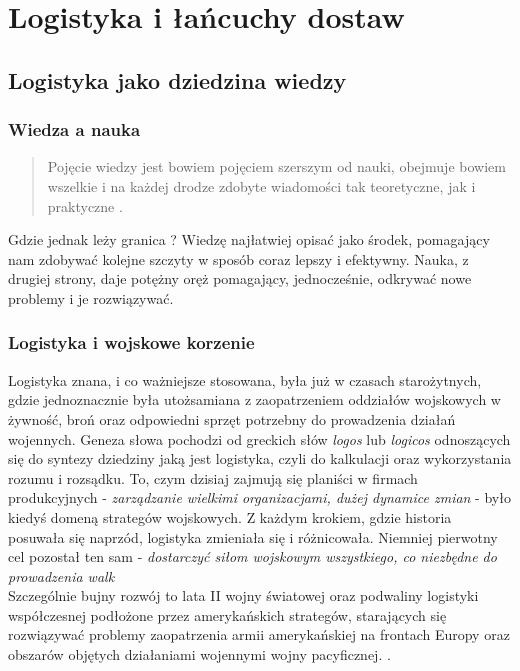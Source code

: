\chapter{Logistyka i łańcuchy dostaw}
\label{c2:c2}

\section{Logistyka jako dziedzina wiedzy}
	\subsection{Wiedza a nauka}	
		\begin{quote}
			Pojęcie wiedzy jest bowiem pojęciem szerszym od nauki,
			obejmuje bowiem wszelkie i na każdej drodze zdobyte wiadomości
			tak teoretyczne, jak i praktyczne \cite{organizacja_badan_ocen_prac_naukowych}.
		\end{quote}
		
		Gdzie jednak leży granica ? Wiedzę najłatwiej opisać jako środek, pomagający 
		nam zdobywać kolejne szczyty w sposób coraz lepszy i efektywny. Nauka, z drugiej strony,
		daje potężny oręż pomagający, jednocześnie, odkrywać nowe problemy i je rozwiązywać.
		
	\subsection{Logistyka i wojskowe korzenie}
		Logistyka znana, i co ważniejsze stosowana, była już w czasach starożytnych, gdzie jednoznacznie
		była utożsamiana z zaopatrzeniem oddziałów wojskowych w żywność, broń oraz odpowiedni
		sprzęt potrzebny do prowadzenia działań wojennych. Geneza słowa pochodzi od greckich
		słów \emph{logos} lub \emph{logicos} odnoszących się do syntezy dziedziny jaką jest logistyka,
		czyli do kalkulacji oraz wykorzystania rozumu i rozsądku. To, czym dzisiaj zajmują się planiści w 
		firmach produkcyjnych - \emph{zarządzanie wielkimi organizacjami, dużej dynamice zmian} - było kiedyś 
		domeną strategów wojskowych. Z każdym krokiem, gdzie historia posuwała
		się naprzód, logistyka zmieniała się i różnicowała. Niemniej pierwotny cel pozostał ten sam - 
		\emph{dostarczyć siłom wojskowym wszystkiego, co niezbędne do prowadzenia walk} \\
		
		Szczególnie bujny rozwój to lata II wojny światowej oraz podwaliny logistyki współczesnej
		podłożone przez amerykańskich strategów, starających się rozwiązywać problemy zaopatrzenia
		armii amerykańskiej na frontach Europy oraz obszarów objętych działaniami wojennymi wojny pacyficznej. 
		\cite{logistyka_w_przedsiebiorstwie}\cite{logistyka_jako_dziedzina_wiedzy_cz1}.
		
